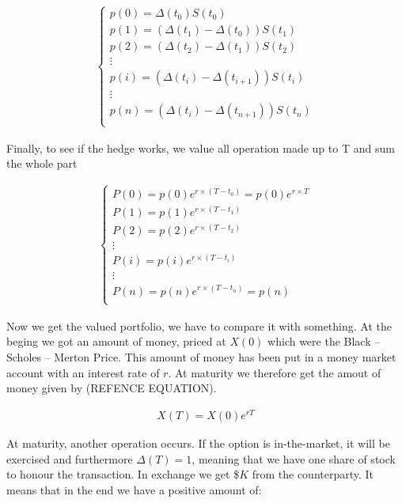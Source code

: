 \documentclass[12pt]{report}
\begin{document}
\begin{align}
\left\{
  \begin{array}{l}
    p(0) = \Delta(t_0) S(t_0) \\
    p(1) = \left(\Delta(t_1) - \Delta(t_0) \right) S(t_1) \\
    p(2) = \left(\Delta(t_2) - \Delta(t_1) \right) S(t_2) \\
    \vdots \\
    p(i) = \left(\Delta(t_i) - \Delta(t_{i + 1}) \right) S(t_i) \\
    \vdots \\
    p(n) = \left(\Delta(t_i) - \Delta(t_{n + 1}) \right) S(t_n) \\
  \end{array}
\right.
\end{align}

Finally, to see if the hedge works, we value all operation made up to T and sum the whole part

\begin{align}
 \left\{
  \begin{array}{l}
    P(0) = p(0) e ^{r \times (T - t_0)} = p(0) e ^{r \times T} \\
    P(1) = p(1) e ^{r \times (T - t_1)} \\
    P(2) = p(2) e ^{r \times (T - t_2)} \\
    \vdots \\
    P(i) = p(i) e ^{r \times (T - t_i)} \\
    \vdots \\
    P(n) = p(n) e ^{r \times (T - t_n)} = p(n) \\
  \end{array}
\right.
\end{align}

Now we get the valued portfolio, we have to compare it with something. At the beging we got an amount of money, priced at $X(0)$ which were the Black -- Scholes -- Merton Price. This amount of money has been put in a money market account with an interest rate of $r$. 
At maturity we therefore get the amout of money given by (REFENCE EQUATION).

\begin{align}
  X(T) = X(0)  e ^{r T}
\end{align}

At maturity, another operation occurs. If the option is in-the-market, it will be exercised and furthermore $\Delta(T) = 1$, meaning that we have one share of stock to honour the transaction. In exchange we get \$$K$ from the counterparty. It means that in the end we have a positive amount of:
\end{document}
